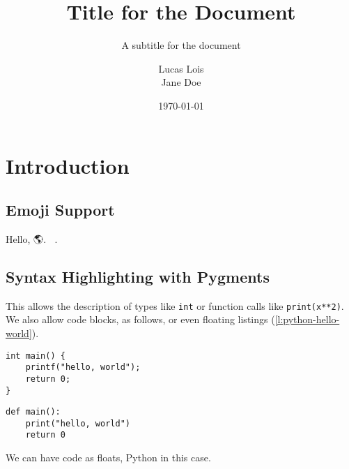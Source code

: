 \documentclass[12pt]{report}
\title{Title for the Document}
\subtitle{A subtitle for the document}
\author{
	Lucas Lois\\
	Jane Doe
}
\institute{Universidad Católica del Uruguay}
\date{\today}
\begin{document}

\tableofcontents
\chapter{Introduction}

\blindtext \parencite{coulouris}

\section{Emoji Support 🙌}

Hello, 🌎. 🚀🌝.

\section{Syntax Highlighting with Pygments}

This allows the description of types like \texttt{int} or function calls
like \texttt{print(x**2)}.
We also allow code blocks, as follows, or even floating listings
(\ref{l:python-hello-world}).

\begin{verbatim}
int main() {
    printf("hello, world");
    return 0;
}
\end{verbatim}

\blindtext

\begin{listing}
\begin{verbatim}
def main():
    print("hello, world")
    return 0
\end{verbatim}
\caption{We can have code as floats, Python in this case.}
\label{l:python-hello-world}
\end{listing}


\pagebreak
\printbibliography{}
\end{document}
